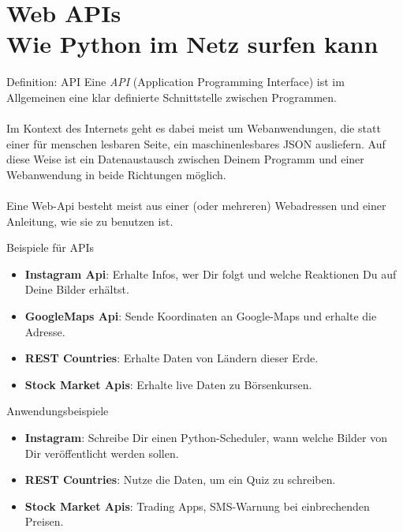 \section{Web APIs\\ \footnotesize Wie Python im Netz surfen kann}


\begin{frame}

\begin{block}{Definition: API}
\vspace{2pt}
Eine \emph{API} (Application Programming Interface) ist im Allgemeinen eine klar definierte Schnittstelle zwischen Programmen. \\ \\
Im Kontext des Internets geht es dabei meist um Webanwendungen, die statt einer für menschen lesbaren Seite, ein maschinenlesbares JSON ausliefern. Auf diese Weise ist ein Datenaustausch zwischen Deinem Programm und einer Webanwendung in beide Richtungen möglich. \\ \\
Eine Web-Api besteht meist aus einer (oder mehreren) Webadressen und einer Anleitung, wie sie zu benutzen ist. 
\end{block}
\end{frame}


\begin{frame}

\begin{exampleblock}{Beispiele für APIs}
\vspace{2pt}
\pause 
\begin{itemize}[<+->]
\item \textbf{Instagram Api}:  Erhalte Infos, wer Dir folgt und welche Reaktionen Du auf Deine Bilder erhältst.
\item \textbf{GoogleMaps Api}:  Sende Koordinaten an Google-Maps und erhalte die Adresse.
\item \textbf{REST Countries}: Erhalte Daten von Ländern dieser Erde.
\item \textbf{Stock Market Apis}: Erhalte live Daten zu Börsenkursen.
\end{itemize}
\end{exampleblock}

\vspace{12pt}
\pause 

\begin{exampleblock}{Anwendungsbeispiele}
\pause 
\begin{itemize}[<+->]
\item \textbf{Instagram}: Schreibe Dir einen Python-Scheduler, wann welche Bilder von Dir veröffentlicht werden sollen. 
\item \textbf{REST Countries}: Nutze die Daten, um ein Quiz zu schreiben.
\item \textbf{Stock Market Apis}: Trading Apps, SMS-Warnung bei einbrechenden Preisen. 
\end{itemize}
\end{exampleblock}
\end{frame}

